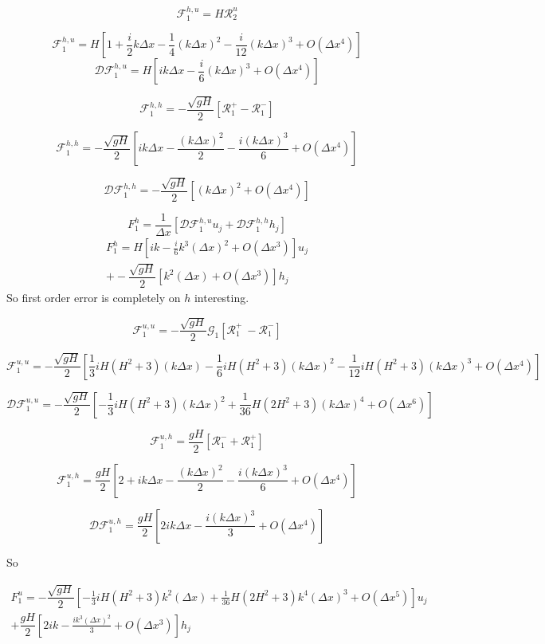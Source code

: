 \documentclass[12pt]{article}
\begin{document}
\[\mathcal{F}^{h,u}_1 = H\mathcal{R}_2^u\]

\[\mathcal{F}^{h,u}_1 = H \left[1 + \frac{i}{2}k\Delta x - \frac{1}{4} (k \Delta x)^2 - \frac{i}{12} (k \Delta x)^3 +  O( \Delta x^4) \right]\]
\[\mathcal{D}\mathcal{F}^{h,u}_1 = H \left[ik\Delta x  - \frac{i}{6} (k \Delta x)^3 +  O( \Delta x^4) \right]\]

\[\mathcal{F}_1^{h,h} = -\dfrac{ \sqrt{gH}}{ 2} \left [ \mathcal{R}_1^+- \mathcal{R}_1^- \right ]\]

\[\mathcal{F}_1^{h,h} = -\dfrac{ \sqrt{gH}}{ 2} \left [ ik\Delta x - \frac{(k\Delta x)^2}{2} - \frac{i(k\Delta x)^3}{6} +  O( \Delta x^4) \right ]\]

\[\mathcal{D}\mathcal{F}_1^{h,h} = -\dfrac{ \sqrt{gH}}{ 2} \left [ (k\Delta x)^2 +  O( \Delta x^4) \right ]\]

\[F^h_1 = \frac{1}{\Delta x} \left[\mathcal{D}\mathcal{F}^{h,u}_1 u_j + \mathcal{D}\mathcal{F}^{h,h}_1 h_j \right]\]
\begin{multline}
F^h_1 =H \left[ik  - \frac{i}{6} k^3( \Delta x)^2 +  O( \Delta x^3) \right]u_j\\ + -\dfrac{ \sqrt{gH}}{ 2} \left [ k^2(\Delta x) +  O( \Delta x^3) \right ]h_j
\end{multline}
So first order error is completely on $h$ interesting. 


\[\mathcal{F}_1^{u,u} = - \dfrac{ \sqrt{gH}}{ 2} \mathcal{G}_1 \left [ \mathcal{R}^+_1 \ -  \mathcal{R}^-_1  \right ]\]

\[\mathcal{F}_1^{u,u} = - \dfrac{ \sqrt{gH}}{ 2}  \left [\frac{1}{3}iH(H^2 + 3)(k \Delta x) - \frac{1}{6}iH(H^2 + 3)(k \Delta x)^2 - \frac{1}{12}iH(H^2 + 3)(k \Delta x)^3  +  O( \Delta x^4)  \right ]\]

\[\mathcal{D}\mathcal{F}_1^{u,u} = - \dfrac{ \sqrt{gH}}{ 2}  \left [-\frac{1}{3}iH(H^2 + 3)(k \Delta x)^2 + \frac{1}{36}H(2H^2 + 3)(k \Delta x)^4 + O( \Delta x^6)  \right ]\]

\[\mathcal{F}_1^{u,h} = \dfrac{ gH}{ 2} [\mathcal{R}^-_1 + \mathcal{R}^+_1]\]

\[\mathcal{F}_1^{u,h} = \dfrac{ gH}{ 2} \left[2 + ik\Delta x - \frac{(k\Delta x)^2}{2} - \frac{i(k\Delta x)^3}{6} +  O( \Delta x^4) \right]\]

\[\mathcal{D}\mathcal{F}_1^{u,h} = \dfrac{ gH}{ 2} \left[2ik\Delta x -\frac{i(k\Delta x)^3}{3} +  O( \Delta x^4) \right]\]

So

\begin{multline}
F^u_1 =- \dfrac{ \sqrt{gH}}{ 2}  \left [-\frac{1}{3}iH(H^2 + 3) k^2( \Delta x) + \frac{1}{36}H(2H^2 + 3)k^4( \Delta x)^3 + O( \Delta x^5)  \right ]u_j\\ + \dfrac{ gH}{ 2} \left[2ik -\frac{i k^3(\Delta x)^2}{3} +  O( \Delta x^3) \right]h_j
\end{multline}
\end{document}
